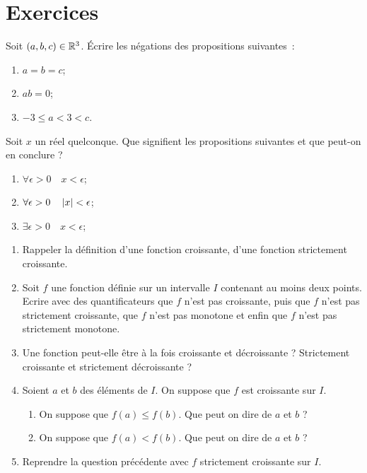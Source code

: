 \section{Exercices}
\begin{exercice}
Soit $(a, b, c) \in \mathbb{R}^3$. Écrire les négations des propositions suivantes~:
\begin{enumerate}
    \item $a=b=c$;
    \item $ab=0$;
    \item $-3 \leqslant a < 3 < c$.
\end{enumerate}
\end{exercice}
%
\begin{exercice}
Soit $x$ un réel quelconque. Que signifient les propositions suivantes et que peut-on en conclure ?
\begin{enumerate}
    \item $\forall \epsilon>0 \quad x<\epsilon$;
    \item $\forall \epsilon>0 \quad \left\lvert x\right\rvert<\epsilon$;
    \item $\exists \epsilon>0 \quad x<\epsilon$;
\end{enumerate}
\end{exercice}
%
\begin{exercice}

\begin{enumerate}
    \item Rappeler la définition d'une fonction croissante, d'une fonction strictement croissante.
    \item Soit $f$ une fonction définie sur un intervalle $I$ contenant au moins deux points. Ecrire avec des
            quantificateurs que $f$ n'est pas croissante, puis que $f$ n'est pas strictement croissante, que $f$ n'est
            pas monotone et enfin que $f$ n'est pas strictement monotone.
    \item Une fonction peut-elle être à la fois croissante et décroissante ? Strictement croissante et strictement
            décroissante ?
    \item Soient $a$ et $b$ des éléments de $I$. On suppose que $f$ est croissante sur $I$.
    \begin{enumerate}
        \item On suppose que $f(a) \leqslant f(b)$. Que peut on dire de $a$ et $b$ ?
        \item On suppose que $f(a) < f(b)$. Que peut on dire de $a$ et $b$ ?
    \end{enumerate}
    \item Reprendre la question précédente avec $f$ strictement croissante sur $I$.
\end{enumerate}
\end{exercice}
